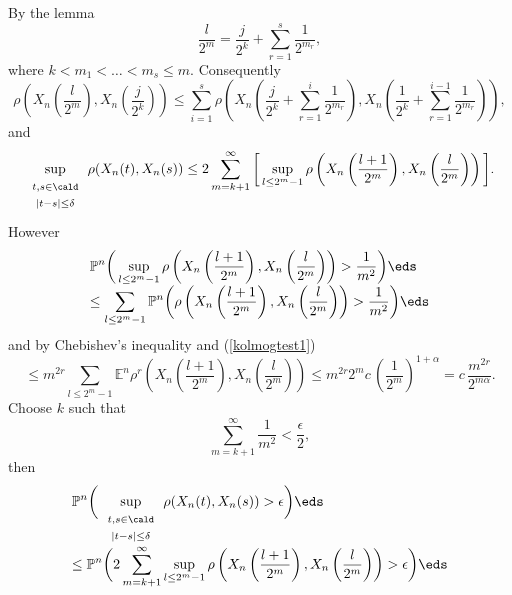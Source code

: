 \documentclass[preprint]{imsart}
\def\P{\mathbb P}
\def\E{\mathbb E}
\def\ds{\displaystyle}
\begin{document}
{
By the lemma
$$
\frac{l}{2^m}= \frac{j}{2^k}+
 \sum_{r=1}^s \frac{1}{2^{m_r}},
$$
where $k< m_1 <\ldots <m_s\leq m$. Consequently
$$
\rho\left(X_n\left(\frac{l}{2^m} \right),
X_n\left(\frac{j}{2^k} \right)\right) \leq
\sum_{i=1}^s
\rho\left(X_n\left(\frac{j}{2^k}+\sum_{r=1}^i
 \frac{1}{2^{m_r}}\right),
X_n\left(\frac{1}{2^k} +\sum_{r=1}^{i-1}
 \frac{1}{2^{m_r}}\right)\right),
$$
and
$$
\sup_{
\begin{array}{c}
\begin{scriptstyle}
 t,s\in \cald
\end{scriptstyle}
 \\ \begin{scriptstyle}
|t-s|\leq \delta
 \end{scriptstyle}
\end{array}
}
\rho(X_n(t),X_n(s)) \leq 2 \sum_{m=k+1}^\infty
\bigg[
\sup_{l\leq 2^m-1}
\rho\left(X_n\left(\frac{l+1}{2^m} \right),
X_n\left(\frac{l}{2^m} \right)\right)
\bigg].
$$
However
$$\begin{array}{l}\ds
 \P^n \bigg(
\sup_{l\leq 2^m-1}
\rho\left(X_n\left(\frac{l+1}{2^m} \right),
X_n\left(\frac{l}{2^m} \right)\right)
>\frac{1}{m^2}
\bigg)
\eds\\\ds
\leq
\sum_{l\leq 2^m-1} \P^n \bigg(
\rho\left(X_n\left(\frac{l+1}{2^m} \right),
X_n\left(\frac{l}{2^m} \right)\right)
>\frac{1}{m^2}
\bigg)
\eds\end{array}
$$
and by Chebishev's inequality and (\ref{kolmogtest1})
$$
\leq m^{2r}\sum_{l\leq 2^m-1} \E^n
\rho^r\left(X_n\left(\frac{l+1}{2^m} \right),
X_n\left(\frac{l}{2^m} \right)\right)
\leq
m^{2r} 2^m c\, \left(\frac{1}{2^m}\right)^{1+\alpha}
= c\, \frac{m^{2r}}{2^{m\alpha}}.
$$
Choose $k$ such that
$$
\sum_{m=k+1}^\infty \frac{1}{m^2} <\frac{\epsilon}{2},
$$
then
$$
  \begin{array}{l}
    \ds
    \P^n \bigg(
\sup_{
\begin{array}{c}
\begin{scriptstyle}
 t,s\in \cald
\end{scriptstyle}
 \\ \begin{scriptstyle}
|t-s|\leq \delta
 \end{scriptstyle}
\end{array}
}
\rho(X_n(t),X_n(s)) > \epsilon\bigg)
\eds \\\ds\leq
 \P^n \bigg(
2 \sum_{m=k+1}^\infty
\sup_{l\leq 2^m-1}
\rho\left(X_n\left(\frac{l+1}{2^m} \right),
X_n\left(\frac{l}{2^m} \right)\right)
>\epsilon \bigg)
\eds \\

\end{array}$$}
\end{document}
